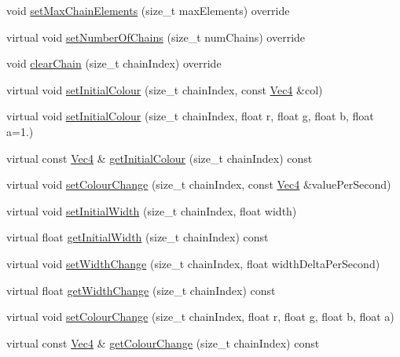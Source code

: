 \begin{DoxyCompactItemize}
\item 
void \hyperlink{classPURibbonTrail_af755423a7832221d273b9e2daae26dbe}{set\+Max\+Chain\+Elements} (size\+\_\+t max\+Elements) override
\item 
virtual void \hyperlink{classPURibbonTrail_a13906fbe3daa9f8b198fa95308dc30fb}{set\+Number\+Of\+Chains} (size\+\_\+t num\+Chains) override
\item 
void \hyperlink{classPURibbonTrail_adb54132f235ef4e7378059f72c76afd2}{clear\+Chain} (size\+\_\+t chain\+Index) override
\item 
virtual void \hyperlink{classPURibbonTrail_a0edec50ab0e916eeaf1670ee4cf4df15}{set\+Initial\+Colour} (size\+\_\+t chain\+Index, const \hyperlink{classVec4}{Vec4} \&col)
\item 
virtual void \hyperlink{classPURibbonTrail_a812b6a2c2e50987e22e28a534f52fcf0}{set\+Initial\+Colour} (size\+\_\+t chain\+Index, float r, float g, float b, float a=1.)
\item 
virtual const \hyperlink{classVec4}{Vec4} \& \hyperlink{classPURibbonTrail_a219cb94e438b1ee2957d78eb2c8695c4}{get\+Initial\+Colour} (size\+\_\+t chain\+Index) const
\item 
virtual void \hyperlink{classPURibbonTrail_a1749004a876834e8cf875abd9fe969e3}{set\+Colour\+Change} (size\+\_\+t chain\+Index, const \hyperlink{classVec4}{Vec4} \&value\+Per\+Second)
\item 
virtual void \hyperlink{classPURibbonTrail_abae89c4ad509b7c21d2020e7327ee32c}{set\+Initial\+Width} (size\+\_\+t chain\+Index, float width)
\item 
virtual float \hyperlink{classPURibbonTrail_a586e54109396fad4c29f0d0938a2e4df}{get\+Initial\+Width} (size\+\_\+t chain\+Index) const
\item 
virtual void \hyperlink{classPURibbonTrail_af3b7d47b5cf1b0bc44f851019601c070}{set\+Width\+Change} (size\+\_\+t chain\+Index, float width\+Delta\+Per\+Second)
\item 
virtual float \hyperlink{classPURibbonTrail_aefadbf42e7c96432fdf60511b78b3289}{get\+Width\+Change} (size\+\_\+t chain\+Index) const
\item 
virtual void \hyperlink{classPURibbonTrail_ac344cbb2bf3277fe737c6152a2468832}{set\+Colour\+Change} (size\+\_\+t chain\+Index, float r, float g, float b, float a)
\item 
virtual const \hyperlink{classVec4}{Vec4} \& \hyperlink{classPURibbonTrail_ab556e5f1f6d0d7fd4e128c1eef5060b6}{get\+Colour\+Change} (size\+\_\+t chain\+Index) const
\item 

\end{DoxyCompactItemize}
